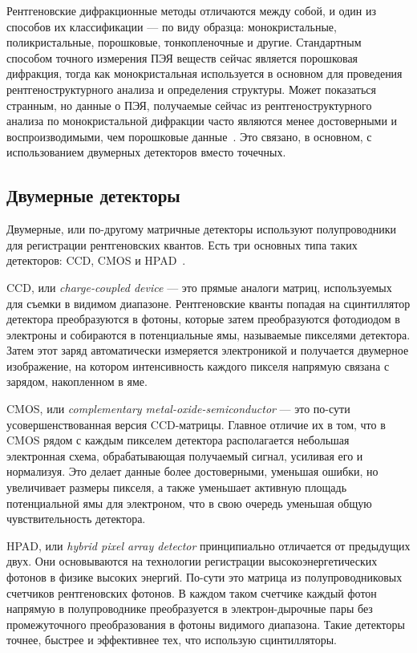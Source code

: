 \documentclass[a4paper,14pt]{extarticle}
\begin{document}
Рентгеновские дифракционные методы отличаются между собой, и один из способов их классификации --- по виду образца: монокристальные, поликристальные, порошковые, тонкопленочные и другие.
Стандартным способом точного измерения ПЭЯ веществ сейчас является порошковая дифракция, тогда как монокристальная используется в основном для проведения рентгеноструктурного анализа и определения структуры.
Может показаться странным, но данные о ПЭЯ, получаемые сейчас из рентгеноструктурного анализа по монокристальной дифракции часто являются менее достоверными и воспроизводимыми, чем порошковые данные~\cite{Dudka:2017}.
Это связано, в основном, с использованием двумерных детекторов вместо точечных.

\subsection{Двумерные детекторы}

Двумерные, или по-другому матричные детекторы используют полупроводники для регистрации рентгеновских квантов.
Есть три основных типа таких детекторов: CCD, CMOS и HPAD~\cite{Alle:2016}.

CCD, или \textit{charge-coupled device} --- это прямые аналоги матриц, используемых для съемки в видимом диапазоне.
Рентгеновские кванты попадая на сцинтиллятор детектора преобразуются в фотоны, которые затем преобразуются фотодиодом в электроны и собираются в потенциальные ямы, называемые пикселями детектора.
Затем этот заряд автоматически измеряется электроникой и получается двумерное изображение, на котором интенсивность каждого пикселя напрямую связана с зарядом, накопленном в яме.

CMOS, или \textit{complementary metal-oxide-semiconductor} --- это по-сути усовершенствованная версия CCD-матрицы.
Главное отличие их в том, что в CMOS рядом с каждым пикселем детектора располагается небольшая электронная схема, обрабатывающая получаемый сигнал, усиливая его и нормализуя.
Это делает данные более достоверными, уменьшая ошибки, но увеличивает размеры пикселя, а также уменьшает активную площадь потенциальной ямы для электроном, что в свою очередь уменьшая общую чувствительность детектора.

HPAD, или \textit{hybrid pixel array detector} принципиально отличается от предыдущих двух.
Они основываются на технологии регистрации высокоэнергетических фотонов в физике высоких энергий.
По-сути это матрица из полупроводниковых счетчиков рентгеновских фотонов.
В каждом таком счетчике каждый фотон напрямую в полупроводнике преобразуется в электрон-дырочные пары без промежуточного преобразования в фотоны видимого диапазона.
Такие детекторы точнее, быстрее и эффективнее тех, что использую сцинтилляторы.
\end{document}
